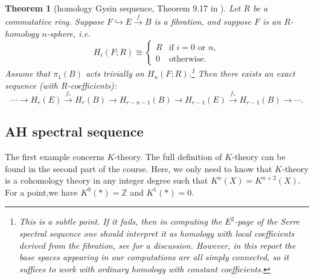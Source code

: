 \documentclass[a4paper,11pt]{article}
\newtheorem{theorem}{Theorem}[section]
\theoremstyle{definition}
\theoremstyle{remark}
\begin{document}
\begin{theorem}[homology Gysin sequence, Theorem 9.17 in \cite{davis2001lecture}]\label{thm:2.4}
	Let $R$ be a commutative ring. Suppose $F \hookrightarrow E \xrightarrow{\,f\,} B$ is a fibration,
	and suppose $F$ is an $R$-homology $n$-sphere, i.e.
	\[
	H_i(F;R)\cong
	\begin{cases}
		R & \text{if } i=0 \text{ or } n,\\
		0 & \text{otherwise.}
	\end{cases}
	\]
	Assume that $\pi_1(B)$ acts trivially on $H_n(F;R)$.\footnote{This is a subtle point. If it fails, then in computing the $E^2$-page of the Serre spectral sequence one should interpret it as homology with local coefficients derived from the fibration, see \cite[Chapter 5 and Theorem 9.6]{davis2001lecture} for a discussion. However, in this report the base spaces appearing in our computations are all simply connected, so it suffices to work with ordinary homology with constant coefficients.} Then there exists an exact sequence
	(with $R$-coefficients):
	\[
	\cdots \longrightarrow H_r(E) \xrightarrow{\,f_*\,} H_r(B)
	\longrightarrow H_{r-n-1}(B)
	\longrightarrow H_{r-1}(E) \xrightarrow{\,f_*\,} H_{r-1}(B)
	\longrightarrow \cdots .
	\]
\end{theorem}

\subsection{AH spectral sequence}
The first example concerns $K$-theory. The full definition of $K$-theory can be found in the second part of the course. Here, we only need to know that $K$-theory is a cohomology theory in any integer degree such that $K^n(X) = K^{n+2}(X)$. For a point,we have $K^0(*)=\mathbb{Z}$ and $K^{1}(*)=0$.
\end{document}
